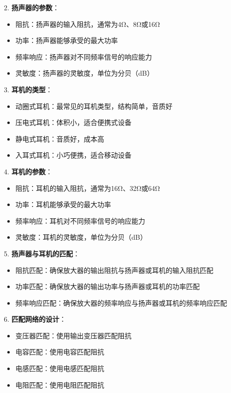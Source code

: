\documentclass[12pt,UTF8]{ctexbook}
\begin{document}
2. \textbf{扬声器的参数}：
   \begin{itemize}[leftmargin=3.5em]
   \item 阻抗：扬声器的输入阻抗，通常为4Ω、8Ω或16Ω
   \item 功率：扬声器能够承受的最大功率
   \item 频率响应：扬声器对不同频率信号的响应能力
   \item 灵敏度：扬声器的灵敏度，单位为分贝（dB）
   \end{itemize}

3. \textbf{耳机的类型}：
   \begin{itemize}[leftmargin=3.5em]
   \item 动圈式耳机：最常见的耳机类型，结构简单，音质好
   \item 压电式耳机：体积小，适合便携式设备
   \item 静电式耳机：音质好，成本高
   \item 入耳式耳机：小巧便携，适合移动设备
   \end{itemize}

4. \textbf{耳机的参数}：
   \begin{itemize}[leftmargin=3.5em]
   \item 阻抗：耳机的输入阻抗，通常为16Ω、32Ω或64Ω
   \item 功率：耳机能够承受的最大功率
   \item 频率响应：耳机对不同频率信号的响应能力
   \item 灵敏度：耳机的灵敏度，单位为分贝（dB）
   \end{itemize}

5. \textbf{扬声器与耳机的匹配}：
   \begin{itemize}[leftmargin=3.5em]
   \item 阻抗匹配：确保放大器的输出阻抗与扬声器或耳机的输入阻抗匹配
   \item 功率匹配：确保放大器的输出功率与扬声器或耳机的功率匹配
   \item 频率响应匹配：确保放大器的频率响应与扬声器或耳机的频率响应匹配
   \end{itemize}

6. \textbf{匹配网络的设计}：
   \begin{itemize}[leftmargin=3.5em]
   \item 变压器匹配：使用输出变压器匹配阻抗
   \item 电容匹配：使用电容匹配阻抗
   \item 电感匹配：使用电感匹配阻抗
   \item 电阻匹配：使用电阻匹配阻抗
   \end{itemize}
\end{document}
